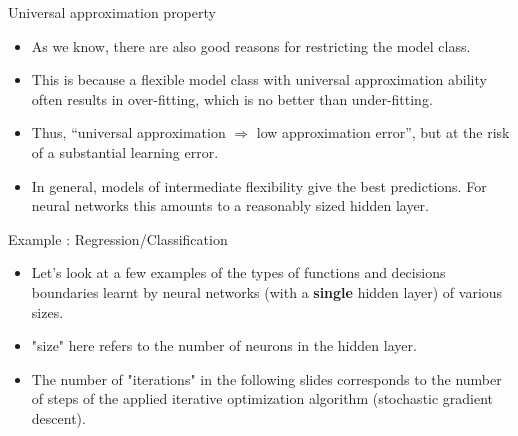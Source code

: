 \documentclass[11pt,compress,t,notes=noshow, xcolor=table]{beamer}
\begin{document}
\begin{vbframe}{Universal approximation property}
  \begin{itemize}
    \vspace{5mm}
    \item As we know, there are also good reasons for restricting the model class.
    \vspace{5mm}
    \item This is because a flexible model class with universal approximation
    ability often results in over-fitting, which is no better than
    under-fitting.
    \vspace{5mm}
    \item Thus, \enquote{universal approximation $\Rightarrow$ low approximation error}, but at the risk of a substantial learning error.
    \vspace{5mm}
    \item In general, models of intermediate flexibility give the best predictions.
    For neural networks this amounts to a reasonably sized hidden layer.
  \end{itemize}
\end{vbframe}

\begin{frame} {Example : Regression/Classification}
  \begin{itemize}
    \vspace{15mm}
    \item Let's look at a few examples of the types of functions and decisions boundaries learnt by neural networks (with a \textbf{single} hidden layer) of various sizes.
        \vspace{5mm}
        \item "size" here refers to the number of neurons in the hidden layer.
    \vspace{5mm}
    \item The number of "iterations" in the following slides corresponds to the number of steps of the applied iterative optimization algorithm (stochastic gradient descent).
  \end{itemize}
\end{frame}
\end{document}
